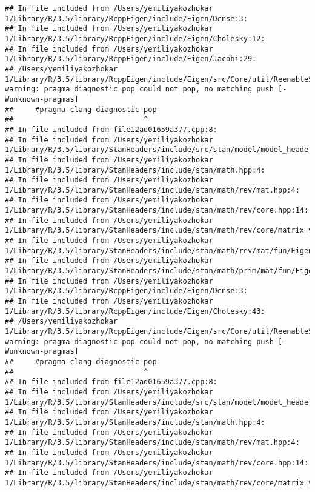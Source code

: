 \documentclass[]{article}
\begin{document}
\begin{verbatim}
## In file included from /Users/yemiliyakozhokar 1/Library/R/3.5/library/RcppEigen/include/Eigen/Dense:3:
## In file included from /Users/yemiliyakozhokar 1/Library/R/3.5/library/RcppEigen/include/Eigen/Cholesky:12:
## In file included from /Users/yemiliyakozhokar 1/Library/R/3.5/library/RcppEigen/include/Eigen/Jacobi:29:
## /Users/yemiliyakozhokar 1/Library/R/3.5/library/RcppEigen/include/Eigen/src/Core/util/ReenableStupidWarnings.h:10:30: warning: pragma diagnostic pop could not pop, no matching push [-Wunknown-pragmas]
##     #pragma clang diagnostic pop
##                              ^
## In file included from file12ad01659a377.cpp:8:
## In file included from /Users/yemiliyakozhokar 1/Library/R/3.5/library/StanHeaders/include/src/stan/model/model_header.hpp:4:
## In file included from /Users/yemiliyakozhokar 1/Library/R/3.5/library/StanHeaders/include/stan/math.hpp:4:
## In file included from /Users/yemiliyakozhokar 1/Library/R/3.5/library/StanHeaders/include/stan/math/rev/mat.hpp:4:
## In file included from /Users/yemiliyakozhokar 1/Library/R/3.5/library/StanHeaders/include/stan/math/rev/core.hpp:14:
## In file included from /Users/yemiliyakozhokar 1/Library/R/3.5/library/StanHeaders/include/stan/math/rev/core/matrix_vari.hpp:4:
## In file included from /Users/yemiliyakozhokar 1/Library/R/3.5/library/StanHeaders/include/stan/math/rev/mat/fun/Eigen_NumTraits.hpp:4:
## In file included from /Users/yemiliyakozhokar 1/Library/R/3.5/library/StanHeaders/include/stan/math/prim/mat/fun/Eigen.hpp:4:
## In file included from /Users/yemiliyakozhokar 1/Library/R/3.5/library/RcppEigen/include/Eigen/Dense:3:
## In file included from /Users/yemiliyakozhokar 1/Library/R/3.5/library/RcppEigen/include/Eigen/Cholesky:43:
## /Users/yemiliyakozhokar 1/Library/R/3.5/library/RcppEigen/include/Eigen/src/Core/util/ReenableStupidWarnings.h:10:30: warning: pragma diagnostic pop could not pop, no matching push [-Wunknown-pragmas]
##     #pragma clang diagnostic pop
##                              ^
## In file included from file12ad01659a377.cpp:8:
## In file included from /Users/yemiliyakozhokar 1/Library/R/3.5/library/StanHeaders/include/src/stan/model/model_header.hpp:4:
## In file included from /Users/yemiliyakozhokar 1/Library/R/3.5/library/StanHeaders/include/stan/math.hpp:4:
## In file included from /Users/yemiliyakozhokar 1/Library/R/3.5/library/StanHeaders/include/stan/math/rev/mat.hpp:4:
## In file included from /Users/yemiliyakozhokar 1/Library/R/3.5/library/StanHeaders/include/stan/math/rev/core.hpp:14:
## In file included from /Users/yemiliyakozhokar 1/Library/R/3.5/library/StanHeaders/include/stan/math/rev/core/matrix_vari.hpp:4:

\end{verbatim}
\end{document}
